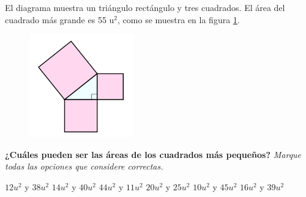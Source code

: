 El diagrama muestra un triángulo rectángulo y tres cuadrados.
El área del cuadrado más grande es 55 u$^2$, como se muestra en la figura \ref{fig:area11}.

\begin{multicols}{2}
    \begin{figure}[H]
        \begin{center}
            \includegraphics[width=0.4\textwidth]{../images/area11.png}
        \end{center}
        \caption{}
        \label{fig:area11}
    \end{figure}
    \textbf{¿Cuáles pueden ser las áreas de los cuadrados más pequeños?}
    \emph{Marque todas las opciones que considere correctas.}
    \begin{checkboxes}
        \choice $12u^2$ y $38u^2$
        \choice $14u^2$ y $40u^2$
        \CorrectChoice $44u^2$ y $11u^2$
        \choice $20u^2$ y $25u^2$
        \CorrectChoice $10u^2$ y $45u^2$
        \CorrectChoice $16u^2$ y $39u^2$
    \end{checkboxes}
\end{multicols}